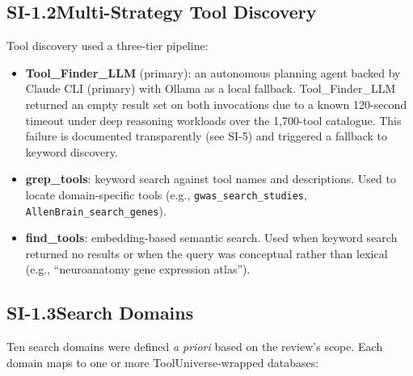 \subsection*{SI-1.2\quad Multi-Strategy Tool Discovery}

Tool discovery used a three-tier pipeline:

\begin{itemize}[nosep]
  \item \textbf{Tool\_Finder\_LLM} (primary): an autonomous planning agent
        backed by Claude CLI (primary) with Ollama as a local fallback.
        Tool\_Finder\_LLM returned an empty result set on both invocations
        due to a known 120-second timeout under deep reasoning workloads
        over the 1,700-tool catalogue.  This failure is documented
        transparently (see SI-5) and triggered a fallback to keyword
        discovery.
  \item \textbf{grep\_tools}: keyword search against tool names and
        descriptions.  Used to locate domain-specific tools (e.g.,
        \texttt{gwas\_search\_studies}, \texttt{AllenBrain\_search\_genes}).
  \item \textbf{find\_tools}: embedding-based semantic search.  Used when
        keyword search returned no results or when the query was conceptual
        rather than lexical (e.g., ``neuroanatomy gene expression atlas'').
\end{itemize}

\subsection*{SI-1.3\quad Search Domains}

Ten search domains were defined \emph{a priori} based on the review's scope.
Each domain maps to one or more ToolUniverse-wrapped databases:

